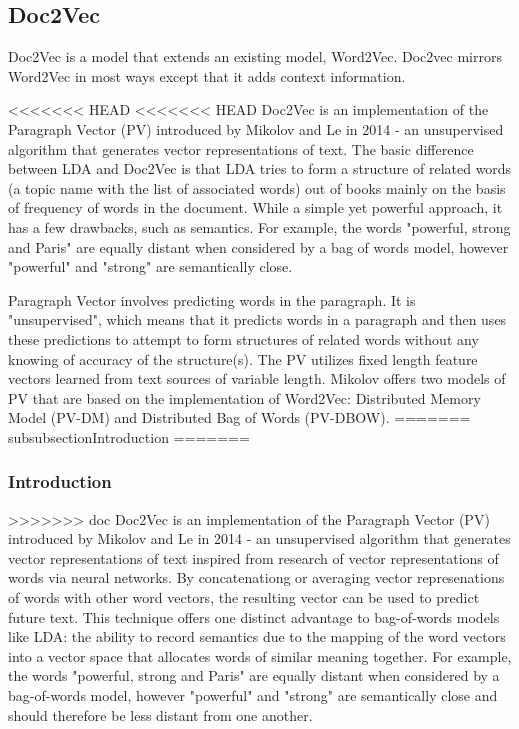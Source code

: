 \subsection{Doc2Vec}
\label{sec:doc2vec}
Doc2Vec is a model that extends an existing model, Word2Vec. Doc2vec mirrors Word2Vec in most ways except that it adds context information. \cite{RefWorks:doc:5a6e5748e4b0d609eec798dd}

<<<<<<< HEAD
<<<<<<< HEAD
Doc2Vec is an implementation of the Paragraph Vector (PV) introduced by Mikolov and Le in 2014 - an unsupervised algorithm that generates vector representations of text. \cite{RefWorks:doc:5a6e5746e4b0d609eec798d7}  The basic difference between LDA and Doc2Vec is that LDA tries to form a structure of related words (a topic name with the list of associated words) out of books mainly on the basis of frequency of words in the document. While a simple yet powerful approach, it has a few drawbacks, such as semantics. For example, the words "powerful, strong and Paris" are equally distant when considered by a bag of words model, however "powerful" and "strong" are semantically close. \cite{RefWorks:doc:5a6e5746e4b0d609eec798d7}
	
Paragraph Vector involves predicting words in the paragraph. It is "unsupervised", which means that it predicts words in a paragraph and then uses these predictions to attempt to form structures of related words without any knowing of accuracy of the structure(s). The PV utilizes fixed length feature vectors learned from text sources of variable length. Mikolov offers two models of PV that are based on the implementation of Word2Vec: Distributed Memory Model (PV-DM) and Distributed Bag of Words (PV-DBOW). 
=======
\\subsubsection{Introduction}
=======
\subsubsection{Introduction}
>>>>>>> doc
Doc2Vec is an implementation of the Paragraph Vector (PV) introduced by Mikolov and Le in 2014 - an unsupervised algorithm that generates vector representations of text inspired from research of vector representations of words via neural networks. \cite{RefWorks:doc:5a6e5746e4b0d609eec798d7} By concatenationg or averaging vector represenations of words with other word vectors, the resulting vector can be used to predict future text. This technique offers one distinct advantage to bag-of-words models like LDA: the ability to record semantics due to the mapping of the word vectors into a vector space that allocates words of similar meaning together. For example, the words "powerful, strong and Paris" are equally distant when considered by a bag-of-words model, however "powerful" and "strong" are semantically close and should therefore be less distant from one another. \cite{RefWorks:doc:5a6e5746e4b0d609eec798d7}
	
